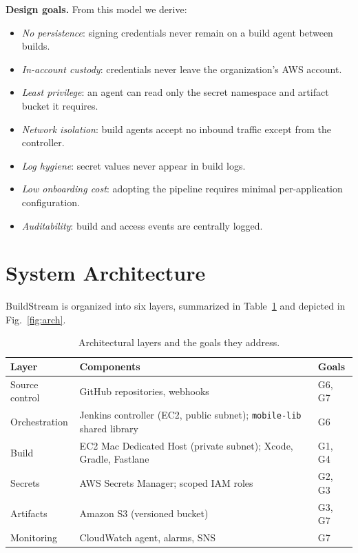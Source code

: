 \documentclass[conference]{IEEEtran}
\begin{document}
\textbf{Design goals.} From this model we derive:
\begin{itemize}
  \item[\textbf{G1}] \emph{No persistence}: signing credentials never remain on a
  build agent between builds.
  \item[\textbf{G2}] \emph{In-account custody}: credentials never leave the
  organization's AWS account.
  \item[\textbf{G3}] \emph{Least privilege}: an agent can read only the secret
  namespace and artifact bucket it requires.
  \item[\textbf{G4}] \emph{Network isolation}: build agents accept no inbound
  traffic except from the controller.
  \item[\textbf{G5}] \emph{Log hygiene}: secret values never appear in build
  logs.
  \item[\textbf{G6}] \emph{Low onboarding cost}: adopting the pipeline requires
  minimal per-application configuration.
  \item[\textbf{G7}] \emph{Auditability}: build and access events are centrally
  logged.
\end{itemize}

\section{System Architecture}\label{sec:arch}
BuildStream is organized into six layers, summarized in
Table~\ref{tab:layers} and depicted in Fig.~\ref{fig:arch}.

\begin{table}[t]
\caption{Architectural layers and the goals they address.}
\label{tab:layers}
\centering
\footnotesize
\begin{tabular}{@{}p{1.55cm}p{4.0cm}p{1.4cm}@{}}
\toprule
\textbf{Layer} & \textbf{Components} & \textbf{Goals} \\
\midrule
Source control & GitHub repositories, webhooks & G6, G7 \\
Orchestration & Jenkins controller (EC2, public subnet); \texttt{mobile-lib} shared library & G6 \\
Build & EC2 Mac Dedicated Host (private subnet); Xcode, Gradle, Fastlane & G1, G4 \\
Secrets & AWS Secrets Manager; scoped IAM roles & G2, G3 \\
Artifacts & Amazon S3 (versioned bucket) & G3, G7 \\
Monitoring & CloudWatch agent, alarms, SNS & G7 \\
\bottomrule
\end{tabular}
\end{table}
\end{document}
